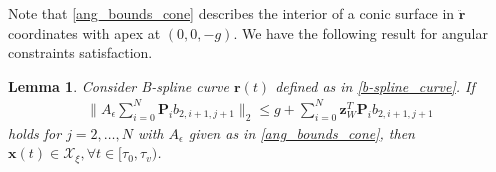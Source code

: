 \documentclass[journal,10pt]{IEEEtran}
\newtheorem{lemma}{\bfseries Lemma}%
\newcommand{\vect}[1]{\boldsymbol{\mathbf{#1}}}
\newcommand{\mat}[1]{\begin{bmatrix} #1 \end{bmatrix}}
\newif\ifdraft
\newcommand{\XX}[1]{\ifdraft{\color{red}[{\bf XX}: #1]}\fi}
\newcommand{\VF}[1]{\ifdraft{\color{blue}[{\bf VF}: #1]}\fi}
\begin{document}
Note that \eqref{ang_bounds_cone} describes the interior of a conic surface in $\ddot{\vect{r}}$ coordinates with apex at $(0,0,-g)$. We have the following result for angular constraints satisfaction.
\begin{lemma}
Consider B-spline curve $\vect{r}(t)$ defined as in \eqref{b-spline_curve}. If
\begin{align} \label{cp_ang}
    \bigg\|A_{\epsilon}\sum_{i=0}^N\vect{P}_ib_{2,i+1,j+1}\bigg\|_2 \leq g + \sum_{i=0}^N\vect{z}_W^T\vect{P}_ib_{2,i+1,j+1}
\end{align}
holds for $j=2,\ldots,N$ with $A_{\epsilon}$ given as in \eqref{ang_bounds_cone}, then $\vect{x}(t)\in\mathcal{X}_{\xi}, \forall  t\in[\tau_0,\tau_v)$.
\end{lemma}
\end{document}
